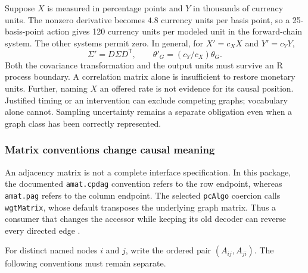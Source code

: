 Suppose \(X\) is measured in percentage points and \(Y\) in thousands of
currency units. The nonzero derivative becomes \(4.8\) currency units
per basis point, so a 25-basis-point action gives 120 currency units per
modeled unit in the forward-chain system. The other systems permit zero.
In general, for \(X'=c_X X\) and \(Y'=c_Y Y\), \[
 \Sigma'=D\Sigma D^{\mathsf T},\qquad
 \theta'_G=(c_Y/c_X)\theta_G.
\] Both the covariance transformation and the output units must survive
an R process boundary. A correlation matrix alone is insufficient to
restore monetary units. Further, naming \(X\) an offered rate is not
evidence for its causal position. Justified timing or an intervention
can exclude competing graphs; vocabulary alone cannot. Sampling
uncertainty remains a separate obligation even when a graph class has
been correctly represented.

\hypertarget{matrix-conventions-change-causal-meaning}{%
\subsubsection{Matrix conventions change causal
meaning}\label{matrix-conventions-change-causal-meaning}}

An adjacency matrix is not a complete interface specification. In this
package, the documented \texttt{amat.cpdag} convention refers to the row
endpoint, whereas \texttt{amat.pag} refers to the column endpoint. The
selected \texttt{pcAlgo} coercion calls \texttt{wgtMatrix}, whose
default transposes the underlying graph matrix. Thus a consumer that
changes the accessor while keeping its old decoder can reverse every
directed edge \citep{exec13_pcalg,exec13_pcalg_reuse_primary}.

For distinct named nodes \(i\) and \(j\), write the ordered pair
\((A_{ij},A_{ji})\). The following conventions must remain separate.

